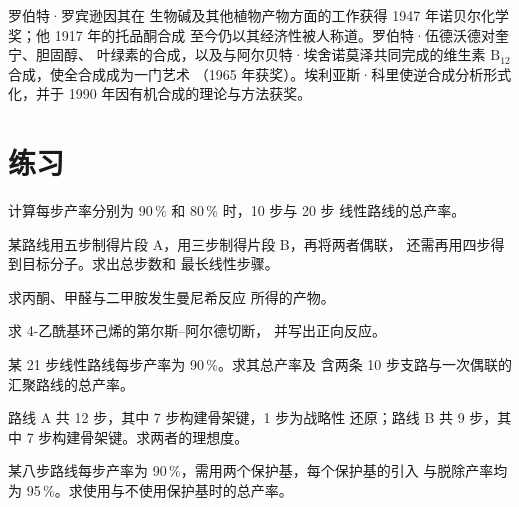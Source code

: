 \begin{history}
罗伯特·罗宾逊因其在
生物碱及其他植物产物方面的工作获得 1947 年诺贝尔化学奖；他 1917 年的托品酮合成
至今仍以其经济性被人称道。罗伯特·伍德沃德对奎宁、胆固醇、
叶绿素的合成，以及与阿尔贝特·埃舍诺莫泽共同完成的维生素 $\mathrm B_{12}$ 合成，使全合成成为一门艺术
（1965 年获奖）。埃利亚斯·科里使逆合成分析形式化，并于
1990 年因有机合成的理论与方法获奖。
\end{history}

\section{练习}

\begin{exercise}[$\star$]\label{exo:b3:total-synthesis:1}
计算每步产率分别为 90\,\% 和 80\,\% 时，10 步与 20 步
线性路线的总产率。
\end{exercise}

\begin{exercise}[$\star$]\label{exo:b3:total-synthesis:2}
某路线用五步制得片段 A，用三步制得片段 B，再将两者偶联，
还需再用四步得到目标分子。求出总步数和
最长线性步骤。
\end{exercise}

\begin{exercise}[$\star$]\label{exo:b3:total-synthesis:3}
求丙酮、甲醛与二甲胺发生曼尼希反应
所得的产物。
\end{exercise}

\begin{exercise}[$\star$]\label{exo:b3:total-synthesis:4}
求 4-乙酰基环己烯的第尔斯–阿尔德切断，
并写出正向反应。
\end{exercise}

\begin{exercise}[$\star\star$]\label{exo:b3:total-synthesis:5}
某 21 步线性路线每步产率为 90\,\%。求其总产率及
含两条 10 步支路与一次偶联的汇聚路线的总产率。
\end{exercise}

\begin{exercise}[$\star\star$]\label{exo:b3:total-synthesis:6}
路线 A 共 12 步，其中 7 步构建骨架键，1 步为战略性
还原；路线 B 共 9 步，其中 7 步构建骨架键。求两者的理想度。
\end{exercise}

\begin{exercise}[$\star\star$]\label{exo:b3:total-synthesis:7}
某八步路线每步产率为 90\,\%，需用两个保护基，每个保护基的引入
与脱除产率均为 95\,\%。求使用与不使用保护基时的总产率。
\end{exercise}

